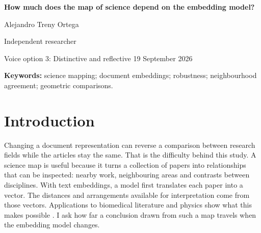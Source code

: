 \documentclass[12pt]{article}
\begin{document}
\begin{center}
{\LARGE\bfseries How much does the map of science depend on the embedding model?\par}
\vspace{12pt}
{\large Alejandro Treny Ortega\par}
\smallskip
Independent researcher\par
\medskip
{\small Voice option 3: Distinctive and reflective \textbullet{} 19 September 2026\par}
\end{center}

\begin{abstract}
A field comparison can survive repeated article selection and still reverse when the embedding model changes. This study examines that problem using ten models and a fixed corpus of 500,000 OpenAlex records from 26 fields and 2000--2024. Matched panels compare field centres, internal relationships and nearest neighbours, with checks on text input and representation settings. The models share broad structure, yet retain only 30.3\% of the 25 nearest neighbours on average within field-period groups. Removing abstracts changes neighbours about as much as changing models; removing titles changes less. A later exploratory analysis examines all 325 field pairs. Persistent opposite orderings across models occur in 262 pairs for angular spread and 221 for effective linear dimension; requiring relative differences above 5\% leaves 96 and 177. Alternative measures preserve many oppositions, although centring and pooling affect the conclusions. The results describe geometric dependence, without establishing thematic correctness. I argue for following a claim through the choices that produce its map. Repeating a result under article selection answers a useful question, but it does not establish that another representation of the same papers supports the same interpretation.
\end{abstract}
\textbf{Keywords:} science mapping; document embeddings; robustness; neighbourhood agreement; geometric comparisons.

\section{Introduction}
Changing a document representation can reverse a comparison between research fields while the articles stay the same. That is the difficulty behind this study. A science map is useful because it turns a collection of papers into relationships that can be inspected: nearby work, neighbouring areas and contrasts between disciplines. With text embeddings, a model first translates each paper into a vector. The distances and arrangements available for interpretation come from those vectors. Applications to biomedical literature and physics show what this makes possible \citep{refbe130e2973,refc0e2cc29e0}. I ask how far a conclusion drawn from such a map travels when the embedding model changes.
\end{document}
